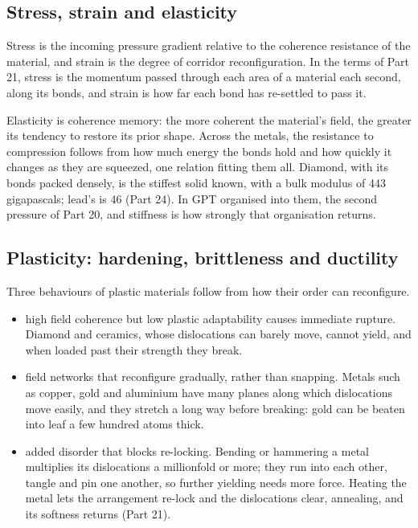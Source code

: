 \documentclass[11pt,a4paper]{article}
\begin{document}
\subsection{Stress, strain and elasticity}

 Stress is the incoming pressure gradient relative to the coherence resistance of the material, and strain is the degree of corridor reconfiguration. In the terms of Part 21, stress is the momentum passed through each area of a material each second, along its bonds, and strain is how far each bond has re-settled to pass it.

Elasticity is coherence memory: the more coherent the material's field, the greater its tendency to restore its prior shape.  Across the metals, the resistance to compression follows from how much energy the bonds hold and how quickly it changes as they are squeezed, one relation fitting them all. Diamond, with its bonds packed densely, is the stiffest solid known, with a bulk modulus of 443 gigapascals; lead's is 46 (Part 24). In GPT  organised into them, the second pressure of Part 20, and stiffness is how strongly that organisation returns.

\subsection{Plasticity: hardening, brittleness and ductility}

Three behaviours of plastic materials follow from how their order can reconfigure.
\begin{itemize}
\item {} high field coherence but low plastic adaptability causes immediate rupture. Diamond and ceramics, whose dislocations can barely move, cannot yield, and when loaded past their strength they break.
\item {} field networks that reconfigure gradually, rather than snapping. Metals such as copper, gold and aluminium have many planes along which dislocations move easily, and they stretch a long way before breaking: gold can be beaten into leaf a few hundred atoms thick.
\item {} added disorder that blocks re-locking. Bending or hammering a metal multiplies its dislocations a millionfold or more; they run into each other, tangle and pin one another, so further yielding needs more force. Heating the metal lets the arrangement re-lock and the dislocations clear, annealing, and its softness returns (Part 21).
\end{itemize}
\end{document}
